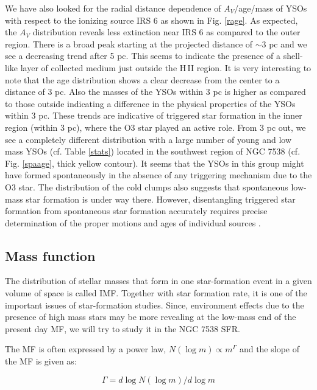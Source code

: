 \documentclass[a4paper,fleqn,usenatbib,useAMS]{mnras}
\begin{document}
We have also looked for the radial distance dependence of $A_V$/age/mass of YSOs with respect 
to the ionizing source IRS 6 as shown in Fig. \ref{rage}.
As expected, the $A_V$ distribution reveals less extinction near IRS 6 as compared to the outer region.
There is a broad peak starting at the projected distance of $\sim$3 pc and we see a decreasing trend after 5 pc. 
This seems to indicate the presence of a shell-like layer of collected medium just outside the H\,{\sevensize II}  region.
It is very interesting to note that the age distribution shows a clear decrease from the center to a distance of 3 pc.
Also 
the masses of the YSOs within 3 pc is higher as compared to those outside indicating a
difference in the  physical properties of the YSOs  within 3 pc.
These trends are indicative of triggered star formation in the inner region (within 3 pc), 
where the O3 star played an active role.
From 3 pc out, we see a completely different distribution 
with a large number of young and low mass YSOs (cf. Table \ref{stats}) located in the southwest region of NGC 7538 
(cf. Fig. \ref{spaage}, thick yellow contour).
It seems that the YSOs in this group might have formed spontaneously in the absence of any triggering mechanism 
due to the O3 star. The distribution of the cold clumps also suggests that spontaneous low-mass star formation is under way there.
However, disentangling triggered star formation from spontaneous star formation accurately requires 
precise determination of the proper motions and ages of individual sources \citep{2015MNRAS.450.1199D}.


\subsection{Mass function}

The distribution of stellar masses that form in one star-formation event in a given
volume of space is called IMF. Together with star formation rate,
it is one of the important issues of star-formation studies.
Since, environment effects due to the presence of high mass stars 
may be more revealing at the low-mass end of the present day MF,
we will try to study it in the NGC 7538 SFR.


The MF is often expressed by a power law,
$N (\log m) \propto m^{\Gamma}$ and  the slope of the MF is given as:

   $$ \Gamma = d \log N (\log m)/d \log m  $$
\end{document}
